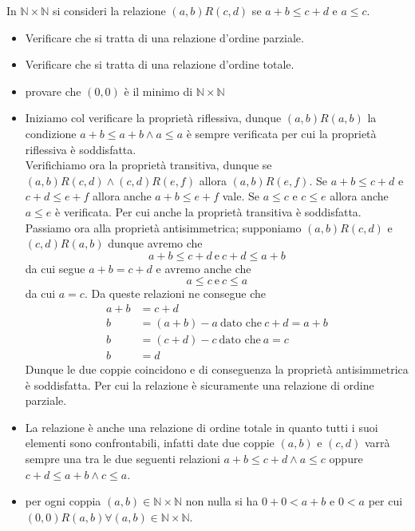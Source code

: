 
\begin{esercizio}
    In $\mathbb{N}\times\mathbb{N}$ si consideri la relazione $(a,b)R(c,d)$ se $a+b \leq c+d$ e $a\leq c$.

\begin{itemize}\setlength\itemsep{1em}
\item Verificare che si tratta di una relazione d'ordine parziale.
\item Verificare che si tratta di una relazione d'ordine totale.
\item provare che $(0,0)$ è il minimo di $\mathbb{N}\times\mathbb{N}$
\end{itemize}
\end{esercizio}

\begin{soluzione}
    \begin{itemize}\setlength\itemsep{1em}
\item Iniziamo col verificare la proprietà riflessiva, dunque $(a,b)R(a,b)$ la condizione $a+b\leq a+b \wedge a\leq a$ è sempre verificata per cui la proprietà riflessiva è soddisfatta.\\ Verifichiamo ora la proprietà transitiva, dunque se $(a,b)R(c,d)\wedge (c,d)R(e,f)$ allora $(a,b)R(e,f)$. Se $a+b\leq c+d$ e $c+d\leq e+f$ allora anche $a+b \leq e+f$ vale. Se $a\leq c$ e $c\leq e$ allora anche $a\leq e$ è verificata. Per cui anche la proprietà transitiva è soddisfatta.\\ Passiamo ora alla proprietà antisimmetrica; supponiamo $(a,b)R(c,d)$ e $(c,d)R(a,b)$ dunque avremo che $$a+b\leq c+d\ \text{e}\ c+d\leq a+b$$ da cui segue $a+b=c+d$ e avremo anche che $$a\leq c\ \text{e}\ c\leq a$$ da cui $a=c$. Da queste relazioni ne consegue che
\begin{align*}
a+b&=c+d\\
b&=(a+b)-a\ \text{dato\ che}\ c+d=a+b\\
b&=(c+d)-c\ \text{dato\ che}\ a=c\\
b&=d
\end{align*}
Dunque le due coppie coincidono e di conseguenza la proprietà antisimmetrica è soddisfatta. Per cui la relazione è sicuramente una relazione di ordine parziale.

\item La relazione è anche una relazione di ordine totale in quanto tutti i suoi elementi sono confrontabili, infatti date due coppie $(a,b)$ e $(c,d)$ varrà sempre una tra le due seguenti relazioni $a+b\leq c+d \wedge a\leq c$ oppure $c+d\leq a+b\wedge c\leq a$.

\item per ogni coppia $(a,b)\in\mathbb{N}\times\mathbb{N}$ non nulla si ha $0+0<a+b$ e $0< a$ per cui $(0,0)R(a,b)\forall (a,b)\in\mathbb{N}\times\mathbb{N}$.
\end{itemize}
\end{soluzione}




